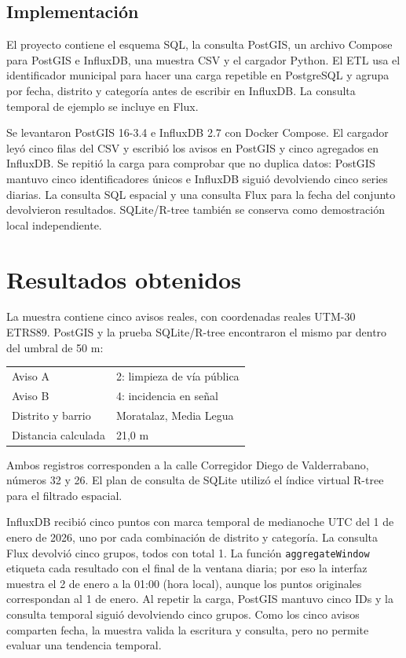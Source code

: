 \documentclass[a4paper,12pt]{article}
\begin{document}
\subsection{Implementación}
El proyecto contiene el esquema SQL, la consulta PostGIS, un archivo Compose para PostGIS e InfluxDB, una muestra CSV y el cargador Python. El ETL usa el identificador municipal para hacer una carga repetible en PostgreSQL y agrupa por fecha, distrito y categoría antes de escribir en InfluxDB. La consulta temporal de ejemplo se incluye en Flux.

Se levantaron PostGIS 16-3.4 e InfluxDB 2.7 con Docker Compose. El cargador leyó cinco filas del CSV y escribió los avisos en PostGIS y cinco agregados en InfluxDB. Se repitió la carga para comprobar que no duplica datos: PostGIS mantuvo cinco identificadores únicos e InfluxDB siguió devolviendo cinco series diarias. La consulta SQL espacial y una consulta Flux para la fecha del conjunto devolvieron resultados. SQLite/R-tree también se conserva como demostración local independiente.
\section{Resultados obtenidos}
La muestra contiene cinco avisos reales, con coordenadas reales UTM-30 ETRS89. PostGIS y la prueba SQLite/R-tree encontraron el mismo par dentro del umbral de 50 m:
\begin{center}\begin{tabular}{ll}\toprule
Aviso A & 2: limpieza de vía pública\\Aviso B & 4: incidencia en señal\\Distrito y barrio & Moratalaz, Media Legua\\Distancia calculada & 21,0 m\\\bottomrule\end{tabular}\end{center}
Ambos registros corresponden a la calle Corregidor Diego de Valderrabano, números 32 y 26. El plan de consulta de SQLite utilizó el índice virtual R-tree para el filtrado espacial.

InfluxDB recibió cinco puntos con marca temporal de medianoche UTC del 1 de enero de 2026, uno por cada combinación de distrito y categoría. La consulta Flux devolvió cinco grupos, todos con total 1. La función \texttt{aggregateWindow} etiqueta cada resultado con el final de la ventana diaria; por eso la interfaz muestra el 2 de enero a la 01:00 (hora local), aunque los puntos originales correspondan al 1 de enero. Al repetir la carga, PostGIS mantuvo cinco IDs y la consulta temporal siguió devolviendo cinco grupos. Como los cinco avisos comparten fecha, la muestra valida la escritura y consulta, pero no permite evaluar una tendencia temporal.
\end{document}
